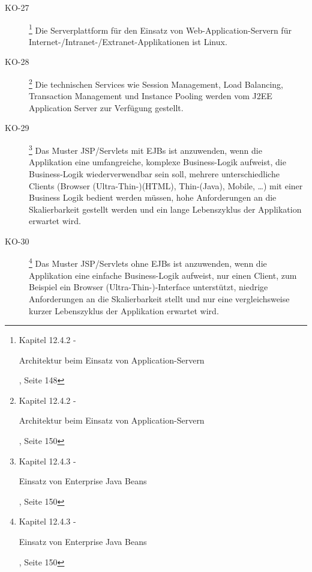 \begin{description}
    \item[KO-27\label{itm:KO-27}]
    \footnote{\cite{ZkbHandbuchDerItArchitektur} Kapitel 12.4.2 -
    \begin{itshape}Architektur beim Einsatz von
    Application-Servern\end{itshape}, Seite 148}
    Die Serverplattform für den Einsatz von Web-Application-Servern für
    Internet-/Intranet-/Extranet-Applikationen ist Linux.
    
    \item[KO-28\label{itm:KO-28}]
    \footnote{\cite{ZkbHandbuchDerItArchitektur} Kapitel 12.4.2 -
    \begin{itshape}Architektur beim Einsatz von
    Application-Servern\end{itshape}, Seite 150}
    Die technischen Services wie Session Management, Load Balancing,
    Transaction Management und Instance Pooling werden vom J2EE Application
    Server zur Verfügung gestellt.
    
    \item[KO-29\label{itm:KO-29}]
    \footnote{\cite{ZkbHandbuchDerItArchitektur} Kapitel 12.4.3 -
    \begin{itshape}Einsatz von Enterprise Java Beans\end{itshape}, Seite 150}
    Das Muster JSP/Servlets mit EJBs ist anzuwenden, wenn die Applikation eine
    umfangreiche, komplexe Business-Logik aufweist, die Business-Logik
    wiederverwendbar sein soll, mehrere unterschiedliche Clients (Browser
    (Ultra-Thin-)(HTML), Thin-(Java), Mobile, …) mit einer Business Logik
    bedient werden müssen, hohe Anforderungen an die Skalierbarkeit gestellt
    werden und ein lange Lebenszyklus der Applikation erwartet wird.
    
    \item[KO-30\label{itm:KO-30}]
    \footnote{\cite{ZkbHandbuchDerItArchitektur} Kapitel 12.4.3 -
    \begin{itshape}Einsatz von Enterprise Java Beans\end{itshape}, Seite 150}
    Das Muster JSP/Servlets ohne EJBs ist anzuwenden, wenn die Applikation eine
    einfache Business-Logik aufweist, nur einen Client, zum Beispiel ein
    Browser (Ultra-Thin-)-Interface unterstützt, niedrige Anforderungen an die
    Skalierbarkeit stellt und nur eine vergleichsweise kurzer Lebenszyklus der
    Applikation erwartet wird.
    

\end{description}
